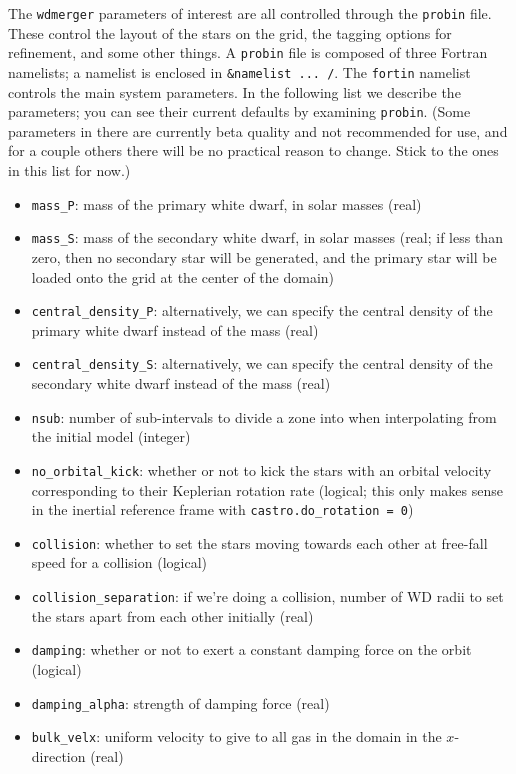\documentclass[12pt]{book}
\begin{document}
The \texttt{wdmerger} parameters of interest are all controlled through the \texttt{probin} file. 
These control the layout of the stars on the grid, the tagging options for refinement, and some other things. 
A \texttt{probin} file is composed of three Fortran namelists; a namelist is enclosed in 
\texttt{\&namelist ... /}. The \texttt{fortin} namelist controls the main system parameters. 
In the following list we describe the parameters; you can see their current defaults by 
examining \texttt{probin}. (Some parameters in there are currently beta quality and 
not recommended for use, and for a couple others there will be no practical reason to change. 
Stick to the ones in this list for now.)
\begin{itemize}
  \item \texttt{mass\_P}: mass of the primary white dwarf, in solar masses (real)
  \item \texttt{mass\_S}: mass of the secondary white dwarf, in solar masses (real; if less than zero, 
    then no secondary star will be generated, and the primary star will be loaded onto the grid at the 
    center of the domain)
  \item \texttt{central\_density\_P}: alternatively, we can specify the central density of the primary white dwarf instead of the mass (real)
  \item \texttt{central\_density\_S}: alternatively, we can specify the central density of the secondary white dwarf instead of the mass (real)
  \item \texttt{nsub}: number of sub-intervals to divide a zone into when interpolating from the initial model (integer)
  \item \texttt{no\_orbital\_kick}: whether or not to kick the stars with an orbital velocity corresponding to their 
    Keplerian rotation rate (logical; this only makes sense in the inertial reference frame with \texttt{castro.do\_rotation = 0})
  \item \texttt{collision}: whether to set the stars moving towards each other at free-fall speed for a collision (logical)
  \item \texttt{collision\_separation}: if we're doing a collision, number of WD radii to set the stars apart from each other initially (real)
  \item \texttt{damping}: whether or not to exert a constant damping force on the orbit (logical)
  \item \texttt{damping\_alpha}: strength of damping force (real)
  \item \texttt{bulk\_velx}: uniform velocity to give to all gas in the domain in the $x$-direction (real)

\end{itemize}
\end{document}
